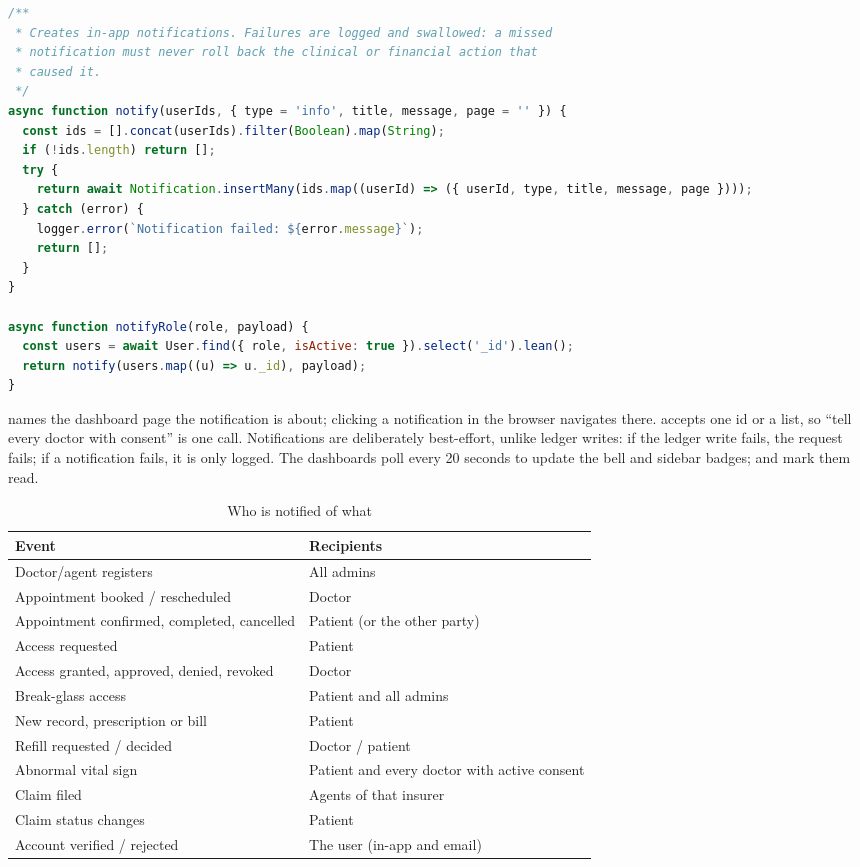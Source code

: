 \begin{lstlisting}[language=JavaScript,caption={notify and notifyRole (\file{src/services/notificationService.js})}]
/**
 * Creates in-app notifications. Failures are logged and swallowed: a missed
 * notification must never roll back the clinical or financial action that
 * caused it.
 */
async function notify(userIds, { type = 'info', title, message, page = '' }) {
  const ids = [].concat(userIds).filter(Boolean).map(String);
  if (!ids.length) return [];
  try {
    return await Notification.insertMany(ids.map((userId) => ({ userId, type, title, message, page })));
  } catch (error) {
    logger.error(`Notification failed: ${error.message}`);
    return [];
  }
}

async function notifyRole(role, payload) {
  const users = await User.find({ role, isActive: true }).select('_id').lean();
  return notify(users.map((u) => u._id), payload);
}
\end{lstlisting}

\begin{howto}
 names the dashboard page the notification is about; clicking a
notification in the browser navigates there.  accepts one id or a
list, so ``tell every doctor with consent'' is one call. Notifications are
deliberately best-effort, unlike ledger writes: if the ledger write fails, the
request fails; if a notification fails, it is only logged. The dashboards poll
 every 20 seconds to update the bell and sidebar
badges;  and  mark them read.
\end{howto}

\begin{table}[H]
\centering\small
\caption{Who is notified of what}\label{tab:notify}
\begin{tabularx}{\textwidth}{@{}YP{6cm}@{}}
\toprule
\textbf{Event} & \textbf{Recipients} \\
\midrule
Doctor/agent registers & All admins \\
Appointment booked / rescheduled & Doctor \\
Appointment confirmed, completed, cancelled & Patient (or the other party) \\
Access requested & Patient \\
Access granted, approved, denied, revoked & Doctor \\
Break-glass access & Patient and all admins \\
New record, prescription or bill & Patient \\
Refill requested / decided & Doctor / patient \\
Abnormal vital sign & Patient and every doctor with active consent \\
Claim filed & Agents of that insurer \\
Claim status changes & Patient \\
Account verified / rejected & The user (in-app and email) \\
\bottomrule
\end{tabularx}
\end{table}
